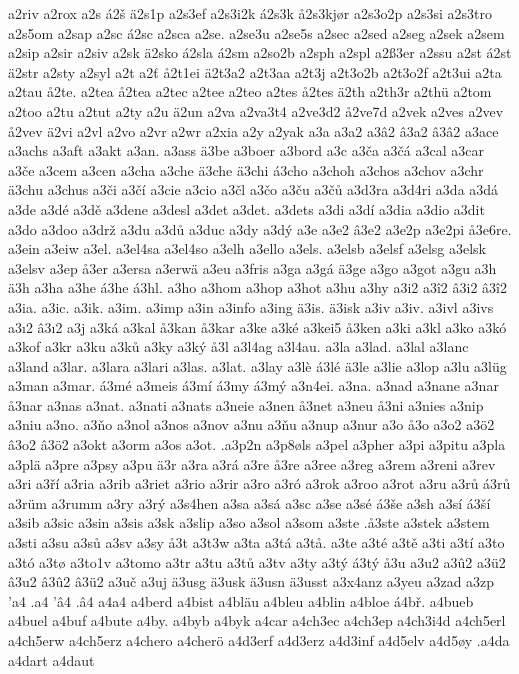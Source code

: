 a2riv
a2rox
a2s
á2š
ä2s1p
a2s3ef
a2s3i2k
á2s3k
å2s3kjør
a2s3o2p
a2s3si
a2s3tro
a2s5om
a2sap
a2sc
á2sc
a2sca
a2se.
a2se3u
a2se5s
a2sec
a2sed
a2seg
a2sek
a2sem
a2sip
a2sir
a2siv
a2sk
ä2sko
á2sla
á2sm
a2so2b
a2sph
a2spl
a2ß3er
a2ssu
a2st
á2st
ä2str
a2sty
a2syl
a2t
a2ť
å2t1ei
ä2t3a2
a2t3aa
a2t3j
a2t3o2b
a2t3o2f
a2t3ui
a2ta
a2tau
å2te.
a2tea
å2tea
a2tec
a2tee
a2teo
a2tes
å2tes
ä2th
a2th3r
a2thü
a2tom
a2too
a2tu
a2tut
a2ty
a2u
ä2un
a2va
a2va3t4
a2ve3d2
å2ve7d
a2vek
a2ves
a2vev
å2vev
ä2vi
a2vl
a2vo
a2vr
a2wr
a2xia
a2y
a2yak
a3a
a3a2
a3â2
â3a2
â3â2
a3ace
a3achs
a3aft
a3akt
a3an.
a3ass
ä3be
a3boer
a3bord
a3c
a3ča
a3čá
a3cal
a3car
a3če
a3cem
a3cen
a3cha
a3che
ä3che
ä3chi
á3cho
a3choh
a3chos
a3chov
a3chr
ä3chu
a3chus
a3či
a3čí
a3cie
a3cio
a3čl
a3čo
a3ču
a3čů
a3d3ra
a3d4ri
a3da
a3dá
a3de
a3dé
a3dě
a3dene
a3desl
a3det
a3det.
a3dets
a3di
a3dí
a3dia
a3dio
a3dit
a3do
a3doo
a3drž
a3du
a3dů
a3duc
a3dy
a3dý
a3e
a3e2
â3e2
a3e2p
a3e2pi
å3e6re.
a3ein
a3eiw
a3el.
a3el4sa
a3el4so
a3elh
a3ello
a3els.
a3elsb
a3elsf
a3elsg
a3elsk
a3elsv
a3ep
å3er
a3ersa
a3erwä
a3eu
a3fris
a3ga
a3gá
ä3ge
a3go
a3got
a3gu
a3h
ä3h
a3ha
a3he
á3he
á3hl.
a3ho
a3hom
a3hop
a3hot
a3hu
a3hy
a3i2
a3î2
â3i2
â3î2
a3ia.
a3ic.
a3ik.
a3im.
a3imp
a3in
a3info
a3ing
ä3is.
ä3isk
a3iv
a3iv.
a3ivl
a3ivs
a3ı2
â3ı2
a3j
a3ká
a3kal
å3kan
å3kar
a3ke
a3ké
a3kei5
å3ken
a3ki
a3kl
a3ko
a3kó
a3kof
a3kr
a3ku
a3ků
a3ky
a3ký
å3l
a3l4ag
a3l4au.
a3la
a3lad.
a3lal
a3lanc
a3land
a3lar.
a3lara
a3lari
a3las.
a3lat.
a3lay
a3lè
á3lé
ä3le
a3lie
a3lop
a3lu
a3lüg
a3man
a3mar.
á3mé
a3meis
á3mí
á3my
á3mý
a3n4ei.
a3na.
a3nad
a3nane
a3nar
å3nar
a3nas
a3nat.
a3nati
a3nats
a3neie
a3nen
å3net
a3neu
å3ni
a3nies
a3nip
a3niu
a3no.
a3ňo
a3nol
a3nos
a3nov
a3nu
a3ňu
a3nup
a3nur
a3o
å3o
a3o2
a3ö2
â3o2
â3ö2
a3okt
a3orm
a3os
a3ot.
.a3p2n
a3p8øls
a3pel
a3pher
a3pi
a3pitu
a3pla
a3plä
a3pre
a3psy
a3pu
ä3r
a3ra
a3rá
a3re
å3re
a3ree
a3reg
a3rem
a3reni
a3rev
a3ri
a3ří
a3ria
a3rib
a3riet
a3rio
a3rir
a3ro
a3ró
a3rok
a3roo
a3rot
a3ru
a3rů
á3rů
a3rüm
a3rumm
a3ry
a3rý
a3s4hen
a3sa
a3sá
a3sc
a3se
a3sé
á3še
a3sh
a3sí
á3ší
a3sib
a3sic
a3sin
a3sis
a3sk
a3slip
a3so
a3sol
a3som
a3ste
.å3ste
a3stek
a3stem
a3sti
a3su
a3sů
a3sv
a3sy
å3t
a3t3w
a3ta
a3tá
a3tå.
a3te
a3té
a3tě
a3ti
a3tí
a3to
a3tó
a3tø
a3to1v
a3tomo
a3tr
a3tu
a3tů
a3tv
a3ty
a3tý
á3tý
å3u
a3u2
a3û2
a3ü2
â3u2
â3û2
â3ü2
a3uč
a3uj
ä3usg
ä3usk
ä3usn
ä3usst
a3x4anz
a3yeu
a3zad
a3zp
'a4
.a4
'â4
.â4
a4a4
a4berd
a4bist
a4bläu
a4bleu
a4blin
a4bloe
á4bř.
a4bueb
a4buel
a4buf
a4bute
a4by.
a4byb
a4byk
a4car
a4ch3ec
a4ch3ep
a4ch3i4d
a4ch5erl
a4ch5erw
a4ch5erz
a4chero
a4cherö
a4d3erf
a4d3erz
a4d3inf
a4d5elv
a4d5øy
.a4da
a4dart
a4daut
